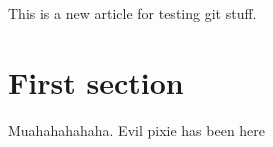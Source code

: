 \documentclass{article}
\begin{document}
This is a new article for testing git stuff.

\section{First section}

Muahahahahaha. Evil pixie has been here
\end{document}
